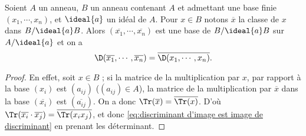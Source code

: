 \documentclass[11pt, %
  title in boldface,
  theorem in new line,
  theorem numbering = section,
  number theorems separately,
  simple name,
]{beaulivre}
\begin{document}
    \begin{lemma}\label{lem:discriminant d'image est image de discriminant}
        Soient \( A \) un anneau, \( B \) un anneau contenant \( A \) et admettant une base finie \( (x_1, \cdots, x_n) \), et \( \ideal{a} \) un idéal de \( A \). Pour \( x \in B \) notons \( \overline{x} \) la classe de \( x \) dans \( B/\ideal{a}B \). Alors \( (\overline{x_1}, \cdots, \overline{x_n}) \) est une base de \( B/\ideal{a}B \) sur \( A/\ideal{a} \) et on a
        \begin{equation}\label{eq:discriminant d'image est image de discriminant}
            \D(\overline{x_1}, \cdots, \overline{x_n}) = \overline{\D(x_1, \cdots, x_n)}.
        \end{equation}
    \end{lemma}
    \begin{proof}
        En effet, soit \( x \in B \) ; si la matrice de la multiplication par \( x \), par rapport à la base \( (x_i) \) est \( (a_{ij}) \) (\( (a_{ij}) \in A \)), la matrice de la multiplication par \( \overline{x} \) dans la base \( (\overline{x_i}) \) est \( (\overline{a_{ij}}) \). On a donc \( \Tr(\overline{x}) = \overline{\Tr(x)} \). D'où \( \Tr(\overline{x_i} \cdot \overline{x_j}) = \overline{\Tr(x_i x_j)} \), et donc \eqref{eq:discriminant d'image est image de discriminant} en prenant les déterminant.
    \end{proof}
\end{document}
